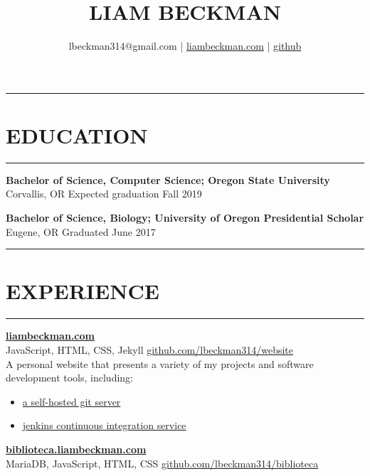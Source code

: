 \documentclass[a4paper]{article}
\title{LIAM BECKMAN}
\author{lbeckman314@gmail.com |  \href{https://liambeckman.com}{liambeckman.com} | \href{https://github.com/lbeckman314}{github}}
\date{\vspace{-5ex}}
\begin{document}
\maketitle

\noindent\rule{\textwidth}{1pt}\vspace{-1.5em}
\section*{EDUCATION}\vspace{-1.5em}
\textcolor[RGB]{128,128,128}{\rule{\linewidth}{1pt}}

\medskip

\textbf{Bachelor of Science, Computer Science; Oregon State University}\\ 
\textcolor[RGB]{128,128,128}{Corvallis, OR \hfill Expected graduation Fall 2019}

\medskip

\textbf{Bachelor of Science, Biology; University of Oregon Presidential Scholar}\\ 
\textcolor[RGB]{128,128,128}{Eugene, OR \hfill Graduated June 2017}

\noindent\rule{\textwidth}{1pt}\vspace{-1.5em}
\section*{EXPERIENCE}\vspace{-1.5em}
\textcolor[RGB]{128,128,128}{\rule{\linewidth}{1pt}}


\textbf{\href{https://liambeckman.com}{liambeckman.com}}\\
\textcolor[RGB]{128,128,128}{JavaScript, HTML, CSS, Jekyll \hfill \href{https://github.com/lbeckman314/website}{github.com/lbeckman314/website}}\\

A personal website that presents a variety of my projects and software development tools, including:

\begin{itemize}
    \item \href{https://git.liambeckman.com}{a self-hosted git server}
    \item \href{https://liambeckman.com/jenkins}{jenkins continuous integration service}
\end{itemize}


\medskip

\textbf{\href{https://biblioteca.liambeckman.com}{biblioteca.liambeckman.com}}\\
\textcolor[RGB]{128,128,128}{MariaDB, JavaScript, HTML, CSS \hfill \href{https://github.com/lbeckman314/biblioteca}{github.com/lbeckman314/biblioteca}}\\
\end{document}
